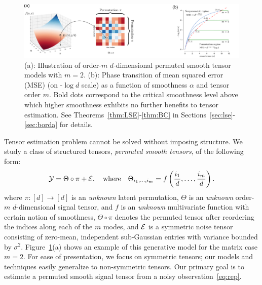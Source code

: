\documentclass{article}
\theoremstyle{definition}
\begin{document}
\begin{figure}[h]
    \centering
    \includegraphics[width = .95\textwidth]{figures/semantic_new.pdf}
    \caption{(a): Illustration of order-$m$ $d$-dimensional permuted smooth tensor models with $m=2$. (b): Phase transition of mean squared error (MSE) (on -$\log d$ scale) as a function of smoothness
$\alpha$ and tensor order $m$. Bold dots correspond to the critical smoothness level above which higher
smoothness exhibits no further benefits to tensor estimation. See Theorems~\ref{thm:LSE}-\ref{thm:BC} in Sections~\ref{sec:lse}-\ref{sec:borda} for details.} \label{fig:rate}
   \vspace{-.2cm}
\end{figure}
Tensor estimation problem cannot be solved without imposing structure. We study a class of structured tensors, \emph{permuted smooth tensors}, of the following form:
\begin{equation}\label{eq:rep}
\mathcal{Y}=\Theta\circ \pi+\mathcal{E},\quad\text{where}\quad \Theta_{i_1,\ldots,i_m} = f\left({i_1\over d},\ldots,{i_m\over d}\right).
\end{equation}
where $\pi\colon[d]\rightarrow[d]$ is an \emph{unknown} latent permutation, $\Theta$ is an \emph{unknown} order-$m$ $d$-dimensional signal tensor, and $f$ is an \emph{unknown} multivariate function with certain notion of smoothness, $\Theta \circ \pi $ denotes the permuted tensor after reordering the indices along each of the $m$ modes, and $\mathcal{E}$ is a symmetric noise tensor consisting of zero-mean, independent sub-Gaussian entries with variance bounded by $\sigma^2$. Figure~\ref{fig:rate}(a) shows an example of this generative model for the matrix case $m=2$. 
For ease of presentation, we focus on symmetric tensors; our models and techniques easily generalize to non-symmetric tensors.  Our primary goal is to estimate a permuted smooth signal tensor from a noisy observation~\eqref{eq:rep}.
\end{document}
